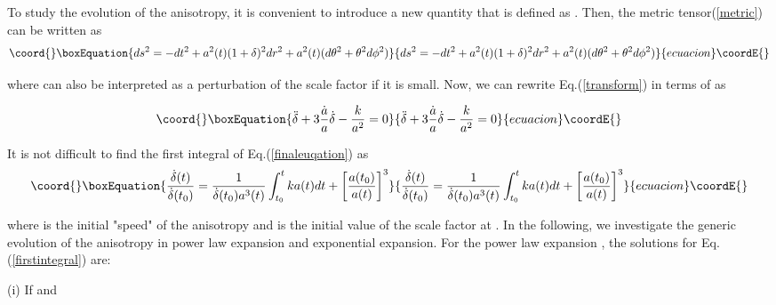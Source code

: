 \documentclass[a4paper,preprint]{revtex4}
\begin{document}
\noindent To study the evolution of the anisotropy, it is
convenient to introduce a new quantity \myHighlight{$\delta$}\coordHE{} that is defined as
\coordHE{}. Then, the metric tensor(\ref{metric})
can be written as
\begin{equation}\coord{}\boxEquation{\label{newmetric}
ds^2=-dt^2+a^2(t)(1+\delta)^2dr^2+a^2(t)(d\theta^2+\theta^2d\phi^2)
}{ds^2=-dt^2+a^2(t)(1+\delta)^2dr^2+a^2(t)(d\theta^2+\theta^2d\phi^2)
}{ecuacion}\coordE{}\end{equation}

\noindent where \myHighlight{$\delta$}\coordHE{} can also be interpreted as a perturbation
of the scale factor if it is small. Now, we can rewrite
Eq.(\ref{transform}) in terms of \myHighlight{$\delta$}\coordHE{} as

\begin{equation}\coord{}\boxEquation{\label{finaleuqation}
\ddot{\delta}+3\frac{\dot{a}}{a}\dot{\delta}-\frac{k}{a^2}=0
}{\ddot{\delta}+3\frac{\dot{a}}{a}\dot{\delta}-\frac{k}{a^2}=0
}{ecuacion}\coordE{}\end{equation}

\noindent It is not difficult to find the first integral of
Eq.(\ref{finaleuqation}) as
\begin{equation}\coord{}\boxEquation{\label{firstintegral}
\frac{\dot{\delta}(t)}{\dot{\delta}(t_0)}=\frac{1}{\dot{\delta}(t_0)a^3(t)}
\int_{t_0}^{t}k a(t) dt + \bigg[\frac{a(t_0)}{a(t)}\bigg]^3
}{\frac{\dot{\delta}(t)}{\dot{\delta}(t_0)}=\frac{1}{\dot{\delta}(t_0)a^3(t)}
\int_{t_0}^{t}k a(t) dt + \bigg[\frac{a(t_0)}{a(t)}\bigg]^3
}{ecuacion}\coordE{}\end{equation}

\noindent where \coordHE{} is the initial "speed" of the
anisotropy and \coordHE{} is the initial value of the scale factor
at \coordHE{}. In the following, we investigate the generic evolution
of the anisotropy in power law expansion and exponential
expansion. For the power law expansion \coordHE{}, the
solutions for Eq.(\ref{firstintegral}) are:

\noindent (i) If \coordHE{} and \coordHE{}
\end{document}
